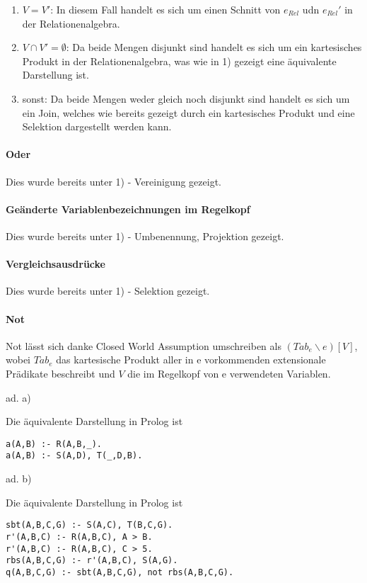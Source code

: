 \documentclass[12pt,a4paper]{amsart}
\begin{document}
\begin{aufgabe1}
\begin{enumerate}
\item $V = V'$: In diesem Fall handelt es sich um einen Schnitt von $e_{Rel}$ udn $e_{Rel}'$ in der Relationenalgebra.
\item $V \cap V' = \emptyset$: Da beide Mengen disjunkt sind handelt es sich um ein kartesisches Produkt in der Relationenalgebra, was wie in 1) gezeigt eine äquivalente Darstellung ist.
\item sonst: Da beide Mengen weder gleich noch disjunkt sind handelt es sich um ein Join, welches wie bereits gezeigt durch ein kartesisches Produkt und eine Selektion dargestellt werden kann.
\end{enumerate}

\paragraph{\textbf{Oder}}
Dies wurde bereits unter 1) - Vereinigung gezeigt.

\paragraph{\textbf{Geänderte Variablenbezeichnungen im Regelkopf}}
Dies wurde bereits unter 1) - Umbenennung, Projektion gezeigt.

\paragraph{\textbf{Vergleichsausdrücke}}
Dies wurde bereits unter 1) - Selektion gezeigt. 

\paragraph{\textbf{Not}}
Not lässt sich danke Closed World Assumption umschreiben als $(Tab_e \backslash e)[V]$, wobei $Tab_e$ das kartesische Produkt aller in e vorkommenden extensionale Prädikate beschreibt und $V$ die im Regelkopf von e verwendeten Variablen.

\end{aufgabe1}


\begin{aufgabe1}
ad. a)

Die äquivalente Darstellung in Prolog ist

\begin{lstlisting}
a(A,B) :- R(A,B,_).
a(A,B) :- S(A,D), T(_,D,B).
\end{lstlisting}

ad. b)

Die äquivalente Darstellung in Prolog ist


\begin{lstlisting}
sbt(A,B,C,G) :- S(A,C), T(B,C,G).
r'(A,B,C) :- R(A,B,C), A > B.
r'(A,B,C) :- R(A,B,C), C > 5.
rbs(A,B,C,G) :- r'(A,B,C), S(A,G).
q(A,B,C,G) :- sbt(A,B,C,G), not rbs(A,B,C,G).
\end{lstlisting}
\end{aufgabe1}

\begin{aufgabe1}
\end{aufgabe1}
\end{document}
